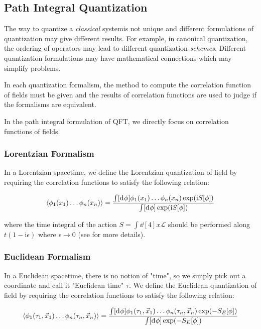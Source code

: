 \documentclass[10pt]{article}
\newcommand{\ii}{\mathrm{i}}
\newenvironment{boxmath}[1]{\begin{tcolorbox}[enhanced,attach boxed title to top center={yshift=-\tcboxedtitleheight/2},boxrule=1pt,title={\centering #1},colframe=NavyBlue!70!black,colback=NavyBlue!10,colbacktitle=NavyBlue!10,fonttitle=\scshape,coltitle=Black]}{\end{tcolorbox}}
\begin{document}
\subsection{Path Integral Quantization}
\begin{intu}
    The way to quantize a \textit{classical} system\snm is not unique and different formulations of quantization may give different results.
    For example, in canonical quantization, the ordering of operators may lead to different quantization \textit{schemes}.
    Different quantization formulations may have mathematical connections which may simplify problems.
    
    In each quantization formalism, the method to compute the correlation function of fields must be given and the results of correlation functions are used to judge if the formalisms are equivalent.
\end{intu}
In the path integral formulation of QFT, we directly focus on correlation functions of fields.
\subsubsection{Lorentzian Formalism}
In a Lorentzian spacetime, we define the Lorentzian quantization of field by requiring the correlation functions to satisfy the following relation:
\begin{boxmath}{Lorentzian Path Integral Quantization}
    \begin{align}
        \expval{\phi_1(x_1)\dots\phi_n(x_n)}=\frac{\int [\dd[]{\phi}]\phi_1(x_1)\dots\phi_n(x_n)\exp(\ii S[\phi])}{\int[\dd[]{\phi}]\exp(\ii S[\phi])}
    \end{align}
\end{boxmath}
where the time integral of the action $S=\int\dd[4]{x}\mathcal{L}$ should be performed along $t(1-\ii\epsilon)$ where $\epsilon\to0$ (see \cite{Peskin:1995ev} for more details).
\subsubsection{Euclidean Formalism}
In a Euclidean spacetime, there is no notion of "time", so we simply pick out a coordinate and call it "Euclidean time" $\tau$.
We define the Euclidean quantization of field by requiring the correlation functions to satisfy the following relation:
\begin{boxmath}{Euclidean Path Integral Quantization}
    \begin{align}
        \expval{\phi_1(\tau_1,\vec{x}_1)\dots\phi_n(\tau_n,\vec{x}_n)}=\frac{\int [\dd[]{\phi}]\phi_1(\tau_1,\vec{x}_1)\dots\phi_n(\tau_n,\vec{x}_n)\exp(-S_E[\phi])}{\int [\dd[]{\phi}]\exp(-S_E[\phi])}
    \end{align}
\end{boxmath}
\end{document}
